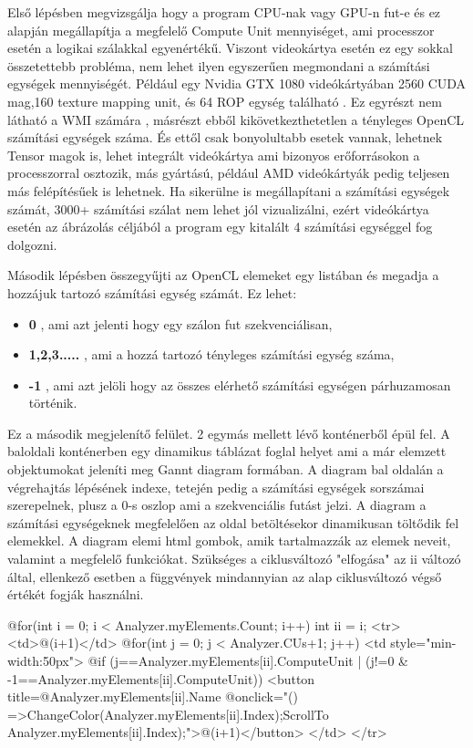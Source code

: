 Első lépésben megvizsgálja hogy a program CPU-nak vagy GPU-n fut-e és ez alapján megállapítja a megfelelő Compute Unit mennyiséget, ami processzor esetén a logikai szálakkal egyenértékű. Viszont videokártya esetén ez egy sokkal összetettebb probléma, nem lehet ilyen egyszerűen megmondani a számítási egységek mennyiségét. Például egy Nvidia GTX 1080 videókártyában 2560 CUDA mag,160 texture mapping unit, és 64 ROP egység található \cite{1080}. Ez egyrészt nem látható a WMI számára \cite{wmi}, másrészt ebből kikövetkezthetetlen a tényleges OpenCL számítási egységek száma. És ettől csak bonyolultabb esetek vannak, lehetnek Tensor \cite{tensor} magok is, lehet integrált videókártya ami bizonyos erőforrásokon a processzorral osztozik, más gyártású, például AMD videókártyák pedig teljesen más felépítésűek is lehetnek. Ha sikerülne is megállapítani a számítási egységek számát, 3000+ számítási szálat nem lehet jól vizualizálni, ezért videókártya esetén az ábrázolás céljából a program egy kitalált 4 számítási egységgel fog dolgozni.

Második lépésben összegyűjti az OpenCL elemeket egy listában és megadja a hozzájuk tartozó számítási egység számát. Ez lehet:
\begin{itemize}
\item\textbf{0} , ami azt jelenti hogy egy szálon fut szekvenciálisan,
\item\textbf{1,2,3.....} , ami a hozzá tartozó tényleges számítási egység száma,
\item\textbf{-1} , ami azt jelöli hogy az összes elérhető számítási egységen párhuzamosan történik.
\end{itemize}

Ez a második megjelenítő felület. 2 egymás mellett lévő konténerből épül fel.
A baloldali konténerben egy dinamikus táblázat foglal helyet ami a már elemzett objektumokat jeleníti meg Gannt diagram formában. A diagram bal oldalán a végrehajtás lépésének indexe, tetején pedig a számítási egységek sorszámai szerepelnek, plusz a 0-s oszlop ami a szekvenciális futást jelzi. A diagram a számítási egységeknek megfelelően az oldal betöltésekor dinamikusan töltődik fel elemekkel. A diagram elemi html gombok, amik tartalmazzák az elemek neveit, valamint a megfelelő funkciókat. Szükséges a ciklusváltozó "elfogása" az ii változó által, ellenkező esetben a függvények mindannyian az alap ciklusváltozó végső értékét fogják használni.

\begin{cpp}
@for(int i = 0; i < Analyzer.myElements.Count; i++)
 {
   int ii = i;
   <tr>
      <td>@(i+1)</td>
      @for(int j = 0; j < Analyzer.CUs+1; j++)
        {
          <td style="min-width:50px">
          @if (j==Analyzer.myElements[ii].ComputeUnit | (j!=0 &
               -1==Analyzer.myElements[ii].ComputeUnit))
             {
                <button title=@Analyzer.myElements[ii].Name @onclick="()
                =>{ChangeColor(Analyzer.myElements[ii].Index);ScrollTo
                Analyzer.myElements[ii].Index);}">@(i+1)</button>
             }
          </td>
        }
   </tr>
 }
\end{cpp}


